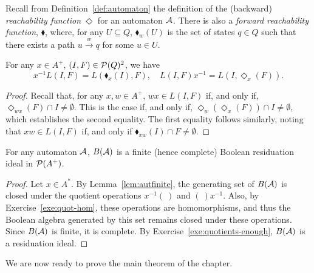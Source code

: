 Recall from Definition~\ref{def:automaton} the definition of the (backward) \emph{reachability function} $\Diamond$ for an automaton $\mathcal{A}$. There is also a \emph{forward reachability function}, $\blacklozenge$, where, for any $U \subseteq Q$,  $\blacklozenge_w(U)$ is the set of states $q \in Q$ such that there exists a path $u \stackrel{w}{\to} q$ for some $u \in U$.
\begin{lemma}\label{lem:autfinite}
For any $x \in A^+$, $(I,F) \in \mathcal{P}(Q)^2$, we have
\[ x^{-1} L(I,F) = L(\blacklozenge_x(I), F), \quad L(I,F)x^{-1} = L(I, \Diamond_x(F)).\]
\end{lemma}
\begin{proof}
  Recall that, for any $x, w \in A^+$, $wx \in L(I,F)$ if, and only if, $\Diamond_{wx}(F) \cap I \neq \emptyset$. This is the case if, and only if, $\Diamond_w(\Diamond_x(F)) \cap I \neq \emptyset$, which establishes the second equality. The first equality follows similarly, noting that $xw \in L(I,F)$ if, and only if $\blacklozenge_{xw}(I) \cap F \neq \emptyset$.
\end{proof}


\begin{proposition}\label{prop:residuationideal}
For any automaton $\mathcal{A}$, $B(\mathcal{A})$ is a finite (hence complete) Boolean residuation ideal in $\mathcal{P}(A^+)$.
\end{proposition}
\begin{proof}
Let $x\in A^*$. By Lemma~\ref{lem:autfinite}, the generating set of $B(\mathcal{A})$ is closed under the quotient operations $x^{-1}(\ )$ and $(\ )x^{-1} $. Also, by Exercise~\ref{exe:quot-hom}, these operations are homomorphisms, and thus the Boolean algebra generated by this set remains closed under these operations. Since $B(\mathcal{A})$ is finite, it is complete. By Exercise~\ref{exe:quotients-enough}, $B(\mathcal{A})$ is a residuation ideal.
\end{proof}
%
We are now ready to prove the main theorem of the chapter.



